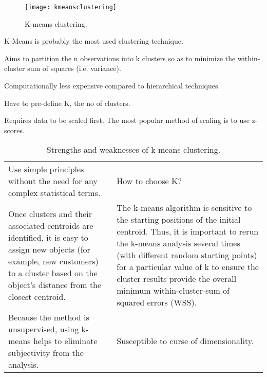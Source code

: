	\begin{figure}[htb]
		\centering
		\texttt{[image: kmeansclustering]}
		\caption[K-means clustering]{K-means clustering.}
		\label{fig:kmeansclustering}
	\end{figure}


	\begin{bulletedlist}
		\item K-Means is probably the most used clustering technique.
		\item Aims to partition the n observations into k clusters so as to minimize the within-cluster sum of squares (i.e. variance).
		\item Computationally less expensive compared to hierarchical techniques.
		\item Have to pre-define K, the no of clusters.
		\item Requires data to be scaled first.  The most popular method of scaling is to use z-scores.
	\end{bulletedlist}


	\begin{table}
        \centering
        \caption[Strengths and weaknesses of k-means clustering]{Strengths and weaknesses of k-means clustering.}
        \label{tab:kmeansclustering}
		\begin{tabular}{|p{}|p{}|} \hline
			\tablecolumnheadervlinesone{Strengths} & \tablecolumnheadervlinestwo{Weakness} \\ \hline
			Use simple principles without the need for any complex statistical terms. &
			How to choose K? \\ \hline
			Once clusters and their associated centroids are identified, it is easy to assign new objects (for example, new customers) to a cluster based on the object's distance from the closest centroid. &
			The k-means algorithm is sensitive to the starting positions of the initial centroid. Thus, it is important to rerun the k-means analysis several times (with different random starting points) for a particular value of k to ensure the cluster results provide the overall minimum within-cluster-sum of squared errors (WSS). \\ \hline
			Because the method is unsupervised, using k-means helps to eliminate subjectivity from the analysis. &
			Susceptible to curse of dimensionality. \\ \hline
		\end{tabular}
	\end{table}

